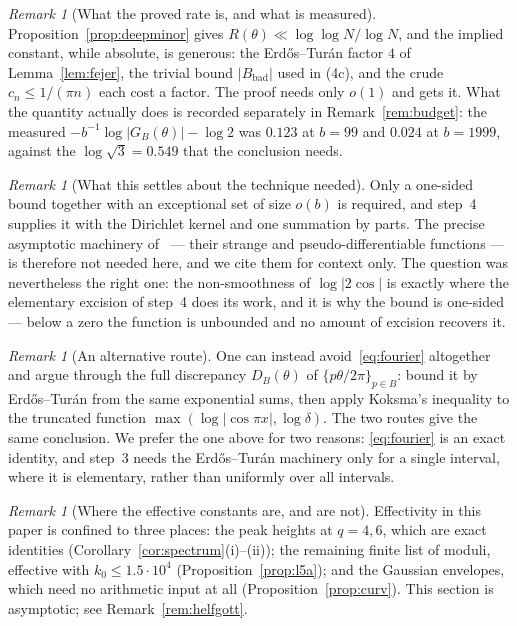 \documentclass[11pt,a4paper]{article}
\theoremstyle{plain}
\theoremstyle{definition}
\theoremstyle{remark}
\newtheorem{remark}[theorem]{Remark}
\begin{document}
\begin{remark}[What the proved rate is, and what is measured]
Proposition~\ref{prop:deepminor} gives $R(\theta)\ll\log\log N/\log N$, and the
implied constant, while absolute, is generous: the Erd\H{o}s--Tur\'an factor $4$
of Lemma~\ref{lem:fejer}, the trivial bound $|B_{\mathrm{bad}}|$ used in (4c),
and the crude $c_n\le1/(\pi n)$ each cost a factor. The proof needs only $o(1)$
and gets it. What the quantity actually does is recorded separately in
Remark~\ref{rem:budget}: the measured
$-b^{-1}\log|G_B(\theta)|-\log2$ was $0.123$ at $b=99$ and $0.024$ at $b=1999$,
against the $\log\sqrt3=0.549$ that the conclusion needs.
\end{remark}

\begin{remark}[What this settles about the technique needed]\label{rem:whatneeded2}
Only a one-sided bound together with an exceptional set of size $o(b)$ is
required, and step~4 supplies it with the Dirichlet kernel and one summation by
parts. The precise asymptotic machinery of~\cite{DRZZ25} --- their strange and
pseudo-differentiable functions --- is therefore not needed here, and we cite
them for context only. The question was nevertheless the right one: the
non-smoothness of $\log|2\cos|$ is exactly where the elementary excision of
step~4 does its work, and it is why the bound is one-sided --- below a zero the
function is unbounded and no amount of excision recovers it.
\end{remark}

\begin{remark}[An alternative route]
One can instead avoid~\eqref{eq:fourier} altogether and argue through the full
discrepancy $D_B(\theta)$ of $\{p\theta/2\pi\}_{p\in B}$: bound it by
Erd\H{o}s--Tur\'an from the same exponential sums, then apply Koksma's
inequality to the truncated function $\max(\log|\cos\pi x|,\log\delta)$. The two
routes give the same conclusion. We prefer the one above for two reasons:
\eqref{eq:fourier} is an exact identity, and step~3 needs the Erd\H{o}s--Tur\'an
machinery only for a single interval, where it is elementary, rather than
uniformly over all intervals.
\end{remark}

\begin{remark}[Where the effective constants are, and are not]
Effectivity in this paper is confined to three places: the peak heights at
$q=4,6$, which are exact identities (Corollary~\ref{cor:spectrum}(i)--(ii)); the
remaining finite list of moduli, effective with $k_0\le1.5\cdot10^{4}$
(Proposition~\ref{prop:l5a}); and the Gaussian envelopes, which need no
arithmetic input at all (Proposition~\ref{prop:curv}). This section is
asymptotic; see Remark~\ref{rem:helfgott}.
\end{remark}
\end{document}
